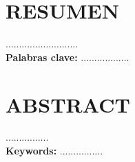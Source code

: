 \chapter*{\centering \large RESUMEN} %

\doublespacing
...........................\\


\textbf{Palabras clave: } ..................






\chapter*{\centering \large ABSTRACT}

................\\

\textbf{Keywords: }................

